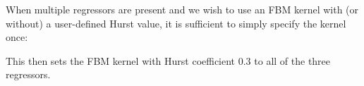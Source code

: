\begin{enumerate}
\begin{knitrout}
\color{fgcolor}\begin{kframe}
\begin{alltt}
 \hlkwb{<-}  \hlopt{~}  \hlopt{+} \hlopt{^}\hlstd{)} \hlopt{+} \hlopt{^}\hlstd{),}  
                   \hlstd{=} \hlstd{(} \hlstd{=} \hlstd{(}\hlstd{,} \hlstd{,}
                                          \hlstd{)))}
\end{alltt}
\end{kframe}
\end{knitrout}

When multiple regressors are present and we wish to use an FBM kernel with (or without) a user-defined Hurst value, it is sufficient to simply specify the kernel once:

\begin{knitrout}
\color{fgcolor}\begin{kframe}
\begin{alltt}
 \hlkwb{<-}  \hlopt{~}  \hlopt{+} \hlopt{^}\hlstd{)} \hlopt{+} \hlopt{^}\hlstd{),}  
                   \hlstd{=} \hlstd{(} \hlstd{=} \hlstd{))}
\end{alltt}
\end{kframe}
\end{knitrout}

This then sets the FBM kernel with Hurst coefficient 0.3 to all of the three regressors.

%
%
%


\end{enumerate}
